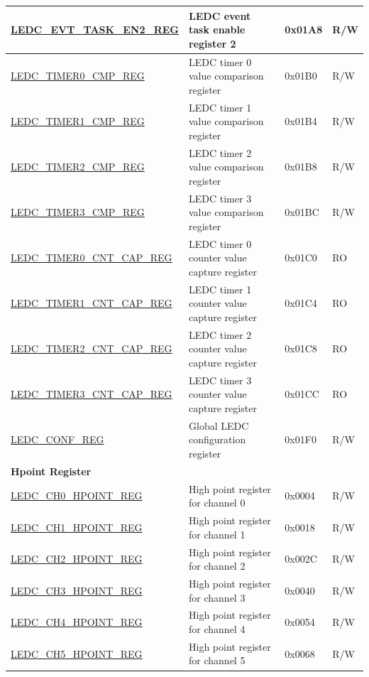 \begin{longtable}{ | m{6cm} | p{6.7cm} | p{1.3cm} | p{1.5cm} | }
\hyperref[regdesc:LEDCEVTTASKEN2REG]{LEDC\_EVT\_TASK\_EN2\_REG} & LEDC event task enable register 2 & 0x01A8 & R/W \\ \hline
\hyperref[regdesc:LEDCTIMERXCMPREG]{LEDC\_TIMER0\_CMP\_REG} & LEDC timer 0 value comparison register & 0x01B0 & R/W \\ \hline
\hyperref[regdesc:LEDCTIMERXCMPREG]{LEDC\_TIMER1\_CMP\_REG} & LEDC timer 1 value comparison register & 0x01B4 & R/W \\ \hline
\hyperref[regdesc:LEDCTIMERXCMPREG]{LEDC\_TIMER2\_CMP\_REG} & LEDC timer 2 value comparison register & 0x01B8 & R/W \\ \hline
\hyperref[regdesc:LEDCTIMERXCMPREG]{LEDC\_TIMER3\_CMP\_REG} & LEDC timer 3 value comparison register & 0x01BC & R/W \\ \hline
\hyperref[regdesc:LEDCTIMERXCNTCAPREG]{LEDC\_TIMER0\_CNT\_CAP\_REG} & LEDC timer 0 counter value capture register & 0x01C0 & RO \\ \hline
\hyperref[regdesc:LEDCTIMERXCNTCAPREG]{LEDC\_TIMER1\_CNT\_CAP\_REG} & LEDC timer 1 counter value capture register & 0x01C4 & RO \\ \hline
\hyperref[regdesc:LEDCTIMERXCNTCAPREG]{LEDC\_TIMER2\_CNT\_CAP\_REG} & LEDC timer 2 counter value capture register & 0x01C8 & RO \\ \hline
\hyperref[regdesc:LEDCTIMERXCNTCAPREG]{LEDC\_TIMER3\_CNT\_CAP\_REG} & LEDC timer 3 counter value capture register & 0x01CC & RO \\ \hline
\hyperref[regdesc:LEDCCONFREG]{LEDC\_CONF\_REG} & Global LEDC configuration register & 0x01F0 & R/W \\ \hline
\multicolumn{4}{|l|}{\textbf{Hpoint Register}} \\ \hline
\hyperref[regdesc:LEDCCHNHPOINTREG]{LEDC\_CH0\_HPOINT\_REG} & High point register for channel 0 & 0x0004 & R/W \\ \hline
\hyperref[regdesc:LEDCCHNHPOINTREG]{LEDC\_CH1\_HPOINT\_REG} & High point register for channel 1 & 0x0018 & R/W \\ \hline
\hyperref[regdesc:LEDCCHNHPOINTREG]{LEDC\_CH2\_HPOINT\_REG} & High point register for channel 2 & 0x002C & R/W \\ \hline
\hyperref[regdesc:LEDCCHNHPOINTREG]{LEDC\_CH3\_HPOINT\_REG} & High point register for channel 3 & 0x0040 & R/W \\ \hline
\hyperref[regdesc:LEDCCHNHPOINTREG]{LEDC\_CH4\_HPOINT\_REG} & High point register for channel 4 & 0x0054 & R/W \\ \hline
\hyperref[regdesc:LEDCCHNHPOINTREG]{LEDC\_CH5\_HPOINT\_REG} & High point register for channel 5 & 0x0068 & R/W \\ \hline

\end{longtable}
